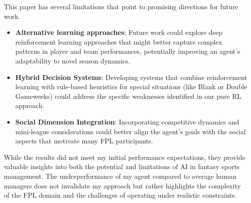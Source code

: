 This paper has several limitations that point to promising directions for future work. 

\begin{itemize}
    \item \textbf{Alternative learning approaches}: Future work could explore deep reinforcement learning approaches that might better capture complex patterns in player and team performances, potentially improving an agent's adaptability to novel season dynamics.
    \item \textbf{Hybrid Decision Systems}: Developing systems that combine reinforcement learning with rule-based heuristics for special situations (like Blank or Double Gameweeks) could address the specific weaknesses identified in our pure RL approach.
    \item \textbf{Social Dimension Integration}: Incorporating competitive dynamics and \\mini-league considerations could better align the agent's goals with the social \\aspects that motivate many FPL participants.
\end{itemize}

While the results did not meet my initial performance expectations, they provide valuable insights into both the potential and limitations of AI in fantasy sports management. The underperformance of my agent compared to average human managers does not invalidate my approach but rather highlights the complexity of the FPL domain and the challenges of operating under realistic constraints.